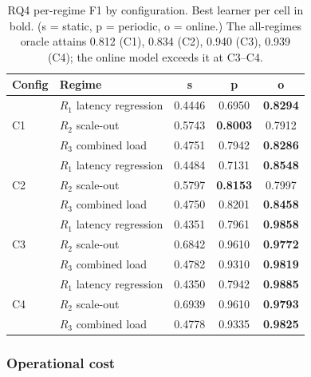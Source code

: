 \documentclass[acmsmall]{acmart}
\begin{document}
\begin{table}[t]
\caption{RQ4 per-regime F1 by configuration. Best learner per cell in bold. (s = static, p = periodic, o = online.) The all-regimes oracle attains 0.812 (C1), 0.834 (C2), 0.940 (C3), 0.939 (C4); the online model exceeds it at C3--C4.}\label{tab:rq4-regime}
\begin{tabular}{@{}llccc@{}}
\toprule
Config & Regime & s & p & o \\
\midrule
\multirow{3}{*}{C1}
 & $R_1$ latency regression & 0.4446 & 0.6950 & \textbf{0.8294} \\
 & $R_2$ scale-out          & 0.5743 & \textbf{0.8003} & 0.7912 \\
 & $R_3$ combined load      & 0.4751 & 0.7942 & \textbf{0.8286} \\
\midrule
\multirow{3}{*}{C2}
 & $R_1$ latency regression & 0.4484 & 0.7131 & \textbf{0.8548} \\
 & $R_2$ scale-out          & 0.5797 & \textbf{0.8153} & 0.7997 \\
 & $R_3$ combined load      & 0.4750 & 0.8201 & \textbf{0.8458} \\
\midrule
\multirow{3}{*}{C3}
 & $R_1$ latency regression & 0.4351 & 0.7961 & \textbf{0.9858} \\
 & $R_2$ scale-out          & 0.6842 & 0.9610 & \textbf{0.9772} \\
 & $R_3$ combined load      & 0.4782 & 0.9310 & \textbf{0.9819} \\
\midrule
\multirow{3}{*}{C4}
 & $R_1$ latency regression & 0.4350 & 0.7942 & \textbf{0.9885} \\
 & $R_2$ scale-out          & 0.6939 & 0.9610 & \textbf{0.9793} \\
 & $R_3$ combined load      & 0.4778 & 0.9335 & \textbf{0.9825} \\
\bottomrule
\end{tabular}
\end{table}

\subsubsection{Operational cost}\label{sec:res-rq4-cost}
\end{document}
